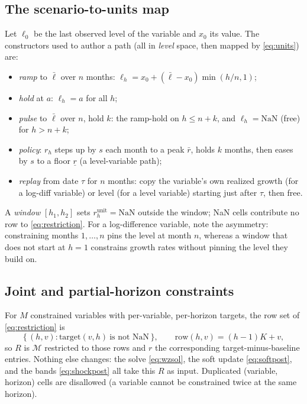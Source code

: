 \documentclass[11pt]{article}
\newcommand{\Mmap}{\mathcal{M}}
\theoremstyle{remark}
\begin{document}
\subsection{The scenario-to-units map}\label{app:scenmap}
Let $\ell_0$ be the last observed level of the variable and $x_0$ its value. The
constructors used to author a path (all in \emph{level} space, then mapped by
\eqref{eq:units}) are:
\begin{itemize}[nosep,leftmargin=1.4em]
\item \emph{ramp} to $\bar\ell$ over $n$ months:
$\ell_h=x_0+(\bar\ell-x_0)\min(h/n,1)$;
\item \emph{hold} at $a$: $\ell_h=a$ for all $h$;
\item \emph{pulse} to $\bar\ell$ over $n$, hold $k$: the ramp-hold on
$h\le n{+}k$, and $\ell_h=\text{NaN}$ (free) for $h>n{+}k$;
\item \emph{policy}: $r_h$ steps up by $s$ each month to a peak $\bar r$, holds
$k$ months, then eases by $s$ to a floor $\underline r$ (a level-variable path);
\item \emph{replay} from date $\tau$ for $n$ months: copy the variable's own
realized growth (for a log-diff variable) or level (for a level variable) starting
just after $\tau$, then free.
\end{itemize}
A \emph{window} $[h_1,h_2]$ sets $r^{\text{unit}}_h=\text{NaN}$ outside the window;
NaN cells contribute no row to \eqref{eq:restriction}. For a log-difference
variable, note the asymmetry: constraining months $1,\dots,n$ pins the level at
month $n$, whereas a window that does not start at $h=1$ constrains growth rates
without pinning the level they build on.

\subsection{Joint and partial-horizon constraints}\label{app:joint}
For $M$ constrained variables with per-variable, per-horizon targets, the row set
of \eqref{eq:restriction} is
\[
\{\,(h,v): \text{target}(v,h)\ \text{is not NaN}\,\},\qquad
\text{row}(h,v)=(h-1)K+v,
\]
so $R$ is $\Mmap$ restricted to those rows and $r$ the corresponding
target-minus-baseline entries. Nothing else changes: the solve \eqref{eq:wzsol},
the soft update \eqref{eq:softpost}, and the bands \eqref{eq:shockpost} all take
this $R$ as input. Duplicated (variable, horizon) cells are disallowed (a variable
cannot be constrained twice at the same horizon).
\end{document}
